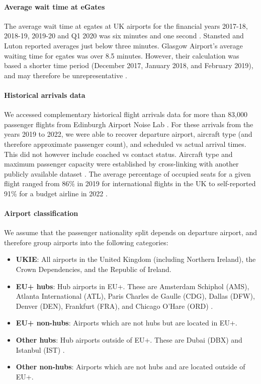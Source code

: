 \documentclass[10pt]{article}
\begin{document}
\paragraph{Average wait time at eGates}
The average wait time at \glspl{egate} at UK airports for the financial years 2017-18, 2018-19, 2019-20 and Q1 2020 was six minutes and one second \cite{Inspection_eGates}. Stansted and Luton reported averages just below three minutes. Glasgow Airport's average waiting time for \glspl{egate} was over 8.5 minutes. However, their calculation was based a shorter time period (December 2017, January 2018, and February 2019), and may therefore be unrepresentative \cite{Inspection_eGates}. 


\paragraph{Historical arrivals data}
We accessed complementary historical flight arrivals data for more than 83,000 passenger flights from Edinburgh Airport Noise Lab \cite{noise_lab}. For these arrivals from the years 2019 to 2022, we were able to recover departure airport, aircraft type (and therefore approximate passenger count), and scheduled vs actual arrival times. This did not however include coached vs contact status. Aircraft type and maximum passenger capacity were established by cross-linking with another publicly available dataset \cite{aircraft_capacity}. The average percentage of occupied seats for a given flight ranged from 86\% in 2019 for international flights in the UK \cite{loading_factor_national} to self-reported 91\% for a budget airline in 2022 \cite{loading_factor_ryanair}.

\paragraph{Airport classification}
We assume that the passenger nationality split depends on departure airport, and therefore group airports into the following categories: 
\begin{itemize}
    \item \textbf{UKIE}: All airports in the United Kingdom (including Northern Ireland), the Crown Dependencies, and the Republic of Ireland.
    \item \textbf{EU+ hubs}: Hub airports in EU+. These are Amsterdam Schiphol (AMS), Atlanta International (ATL), Paris Charles de Gaulle (CDG), Dallas (DFW), Denver (DEN), Frankfurt (FRA), and Chicago O'Hare (ORD) \cite{mega_hubs}.
    \item \textbf{EU+ non-hubs}: Airports which are not hubs but are located in EU+.
    \item \textbf{Other hubs}: Hub airports outside of EU+. These are Dubai (DBX) and Istanbul (IST) \cite{mega_hubs}.
    \item \textbf{Other non-hubs}: Airports which are not hubs and are located outside of EU+.
\end{itemize}
\end{document}
